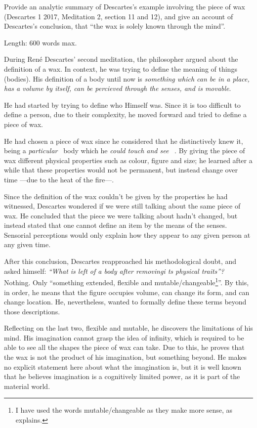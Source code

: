 \documentclass{myassignment}
\begin{document}
\begin{problem}
Provide an analytic summary of Descartes’s example involving the piece of wax (Descartes 1 2017, Meditation 2, section 11 and 12), and give an account of Descartes’s conclusion, that “the wax is solely known through the mind”.%

Length: 600 words max.%
\end{problem}

\begin{answer}
During René Descartes’ second meditation, the philosopher argued about the definition of a wax. In context, he was trying to define the meaning of things (bodies). His definition of a body until now is \emph{something which can be in a place, has a volume by itself, can be percieved through the senses, and is movable}.%

He had started by trying to define who Himself was. Since it is too difficult to define a person, due to their complexity, he moved forward and tried to define a piece of wax.%

He had chosen a piece of wax since he considered that he distinctively knew it, being a \emph{particular}~\nocite{unipaper} body which he \emph{could touch and see} ~\autocite{unipaper}. By giving the piece of wax different physical properties such as colour, figure and size; he learned after a while that these properties would not be permanent, but instead change over time ---due to the heat of the fire---.%

Since the definition of the wax couldn't be given by the properties he had witnessed, Descartes wondered if we were still talking about the same piece of wax. He concluded that the piece we were talking about hadn't changed, but instead stated that one cannot define an item by the means of the senses. Sensorial perceptions would only explain how they appear to any given person at any given time.%

After this conclusion, Descartes reapproached his methodological doubt, and asked himself: \emph{“What is left of a body after removingi ts physical traits”?}~\autocite{unipaper} Nothing. Only “something extended, flexible and mutable/changeable\footnote{I have used the words mutable/changeable as they make more sense, as \textcite{wrongword} explains.}”. By this, in order, he means that the figure occupies volume, can change its form, and can change location. He, nevertheless, wanted to formally define these terms beyond those descriptions.

Reflecting on the last two, flexible and mutable, he discovers the limitations of his mind. His imagination cannot grasp the idea of infinity, which is required to be able to see all the shapes the piece of wax can take. Due to this, he proves that the wax is not the product of his imagination, but something beyond. He makes no explicit statement here about what the imagination is, but it is well known \autocite{limitedimagination} that he believes imagination is a cognitively limited power, as it is part of the material world.


\end{answer}
\end{document}
